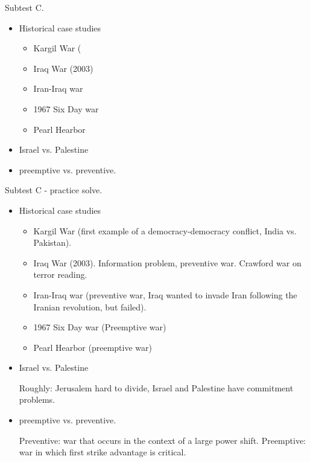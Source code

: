 \documentclass{article}
\begin{document}
  \newpage

  Subtest C.

  \begin{itemize}
    \item Historical case studies

      \begin{itemize}
        \item Kargil War (
        \item Iraq War (2003)
        \item Iran-Iraq war
        \item 1967 Six Day war
        \item Pearl Hearbor
      \end{itemize}
    \item Israel vs. Palestine
    \item preemptive vs. preventive.
  \end{itemize}




  \newpage


  Subtest C - practice solve.

  \begin{itemize}
    \item Historical case studies

      \begin{itemize}
        \item Kargil War (first example of a democracy-democracy conflict, India vs. Pakistan).
        \item Iraq War (2003).  Information problem, preventive war.  Crawford war on terror reading.
        \item Iran-Iraq war (preventive war, Iraq wanted to invade Iran following the Iranian revolution, but failed).
        \item 1967 Six Day war (Preemptive war)
        \item Pearl Hearbor (preemptive war)
      \end{itemize}
    \item Israel vs. Palestine

      Roughly: Jerusalem hard to divide, Israel and Palestine have commitment problems.
    \item preemptive vs. preventive.

      Preventive: war that occurs in the context of a large power shift.  Preemptive: war in which first strike advantage is critical.
  \end{itemize}
\end{document}
